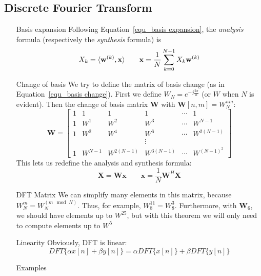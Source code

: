 \documentclass[11pt,a4paper]{article}
\begin{document}
\subsection{Discrete Fourier Transform}
\begin{itemize}
	\item[Basis expansion]Following Equation~\ref{equ_basis expansion}, the \textit{analysis} formula (respectively the \textit{synthesis} formula) is
	      \begin{equation}
		      X_k = \langle\mathbf{w}^{(k)},\mathbf{x}\rangle \qquad \mathbf{x} = \frac{1}{N} \somme{N-1}{k=0}X_k \mathbf{w}^{(k)}
	      \end{equation}
	\item[Change of basis]We try to define the matrix of basis change (as in Equation~\ref{equ_basis change}). First we define $W_N = e^{-j\frac{2\pi}{n}}$ (or $W$ when $N$ is evident). Then the change of basis matrix $\mathbf{W}$ with $\mathbf{W}[n,m] = W_N^{nm}$:
	      \begin{equation}
		      \mathbf{W} =
		      \begin{bmatrix}
			      1 & 1 & 1 & 1 & \cdots & 1
			      \\1 & W^1 & W^2 & W^3 & \cdots & W^{N-1}
			      \\1 & W^2 & W^4 & W^6 & \cdots & W^{2(N-1)}
			      \\& & & \vdots
			      \\1 & W^{N-1} & W^{2(N-1)} & W^{3(N-1)} & \cdots & W^{(N-1)^2}
		      \end{bmatrix}
	      \end{equation}
	      This lets us redefine the analysis and synthesis formula:
	      \begin{equation}
		      \mathbf{X} = \mathbf{W}\mathbf{x} \qquad \mathbf{x} =\frac{1}{N}\mathbf{W}^H \mathbf{X}
	      \end{equation}
	\item[DFT Matrix]We can simplify many elements in this matrix, because $W_N^m = W_N^{(m \mod N)}$. Thus, for example, $W^{11}_8 = W^3_8$. Furthermore, with $\mathbf{W}_6$, we should have elements up to $W^{25}$, but with this theorem we will only need to compute elements up to $W^5$
	\item[Linearity]Obviously, DFT is linear:
	      \begin{equation*}
              DFT\{\alpha x[n] + \beta y[n]\} = \alpha DFT\{x[n]\} + \beta DFT\{y[n]\}
          \end{equation*}
    \item[Examples]

\end{itemize}
\end{document}
